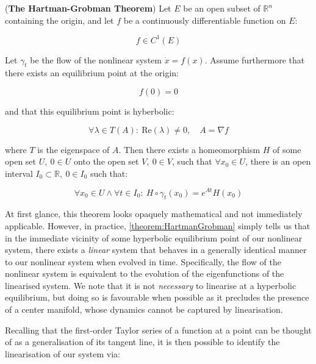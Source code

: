 \begin{theorem}\label{theorem:HartmanGrobman}
(\textbf{The Hartman-Grobman Theorem}) Let $E$ be an open subset of $\mathbb{R}^n$ containing the origin, and let $f$ be a continuously differentiable function on $E$:
 
\begin{equation*}
f \in C^1(E)
\end{equation*}

Let $\gamma_t$ be the flow of the nonlinear system $\dot{x} = f(x)$. Assume furthermore that there exists an equilibrium point at the origin: 

\begin{equation*}
f(0) = 0
\end{equation*}

and that this equilibrium point is hyberbolic: 

\begin{equation*}
\forall \lambda \in T(A): \ \text{Re}(\lambda) \neq 0, \quad A = \nabla f  
\end{equation*}

where $T$ is the eigenspace of $A$. Then there exists a homeomorphism $H$ of some open set $U, \ 0 \in U$ onto the open set $V, \ 0 \in V$, such that $\forall x_0 \in U$, there is an open interval $I_0 \subset \mathbb{R}, \ 0 \in I_0$ such that:

\begin{equation*}
	\forall x_0 \in U \wedge \forall t \in I_0: \ H \circ \gamma_t(x_0) = e^{At}H(x_0)
\end{equation*}
\end{theorem}

At first glance, this theorem looks opaquely mathematical and not immediately applicable. However, in practice, \cref{theorem:HartmanGrobman} simply tells us that in the immediate vicinity of some hyperbolic equilibrium point of our nonlinear system, there exists a \textit{linear} system that behaves in a generally identical manner to our nonlinear system when evolved in time. Specifically, the flow of the nonlinear system is equivalent to the evolution of the eigenfunctions of the linearised system. We note that it is not \textit{necessary} to linearise at a hyperbolic equilibrium, but doing so is favourable when possible as it precludes the presence of a center manifold, whose dynamics cannot be captured by linearisation.

Recalling that the first-order Taylor series of a function at a point can be thought of as a  generalisation of its tangent line, it is then possible to identify the linearisation of our system via:

